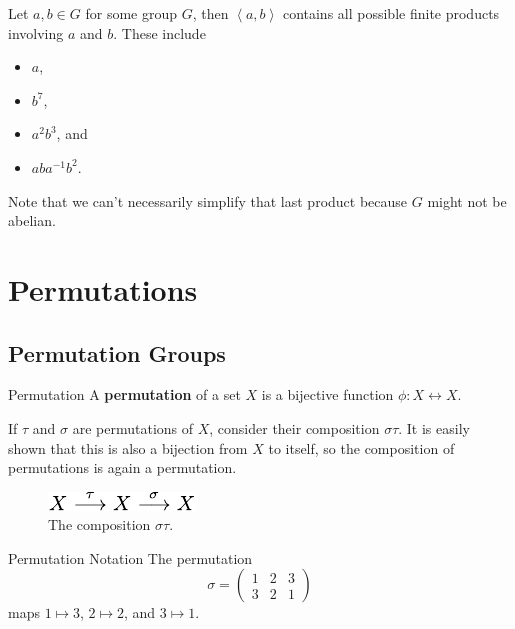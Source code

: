 \documentclass[10pt]{report}
\begin{document}
\begin{ex}{}{}
	Let $a,b \in G$ for some group $G$, then $\left\langle a,b \right\rangle$ contains all possible finite products involving $a$ and $b$. These include
	\begin{itemize}
		\item $a$,
		\item $b^7$,
		\item $a^2 b^3$, and
		\item $a b a^{-1} b^2$.
	\end{itemize}
	Note that we can't necessarily simplify that last product because $G$ might not be abelian.
\end{ex}



\chapter{Permutations}


\section{Permutation Groups}

\begin{defn}{Permutation}{}
A \textbf{permutation} of a set $X$ is a bijective function $\phi:X \leftrightarrow X$.
\end{defn}

If $\tau$ and $\sigma$ are permutations of $X$, consider their composition $\sigma \tau$. It is easily shown that this is also a bijection from $X$ to itself, so the composition of permutations is again a permutation.

\begin{figure}[H]
	\centering
	\includegraphics[scale=1.2]{fig/permutation-composition.pdf}
	\caption{The composition $\sigma \tau$.}
\end{figure}

\begin{note}{Permutation Notation}{}
The permutation
\[
\sigma =
\begin{pmatrix}
	1 & 2 & 3 \\
	3 & 2 & 1
\end{pmatrix}
\] maps $1 \mapsto 3$, $2 \mapsto 2$, and $3 \mapsto 1$.
\end{note}
\end{document}
